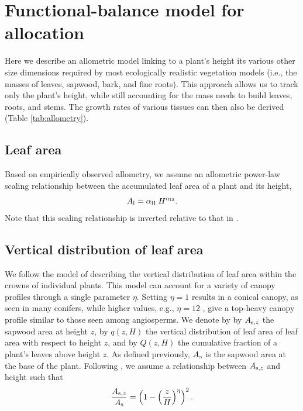 \documentclass[10pt,twoside]{article}
\begin{document}
\section{Functional-balance model for
allocation}\label{a-functional-balance-model-for-allocation}

Here we describe an allometric model linking to a plant's height its various other size dimensions
required by most ecologically realistic vegetation models
(i.e., the masses of leaves, sapwood, bark, and fine
roots). This approach allows us to track only the
plant's height, while still accounting for the mass needs to build
leaves, roots, and stems. The growth rates of various tissues can then
also be derived (Table \ref{tab:allometry}).

\subsection{Leaf area}\label{leaf-area}

Based on empirically observed allometry, we assume an allometric power-law
scaling relationship between the accumulated leaf area of a plant and
its height,
\begin{equation}\label{eq:ha}
A_{\rm l} = \alpha_{{\rm l1}} \, H^{\alpha_{{\rm l2}}}.
\end{equation}
Note that this scaling relationship is inverted relative to that in \citet{Falster-2011}.

\subsection{Vertical distribution of leaf
area}\label{vertical-distribution-of-leaf-area}

We follow the model of \citet{Yokozawa-1995} describing the vertical
distribution of leaf area within the crowns of individual plants. This
model can account for a variety of canopy profiles through a single
parameter \(\eta\). Setting \(\eta = 1\) results in a conical canopy, as
seen in many conifers, while higher values, e.g., \(\eta = 12\) , give a
top-heavy canopy profile similar to those seen among angiosperms. We denote by
by \(A_{{\rm s},z}\) the sapwood area at height \(z\), by \(q(z, H)\) the vertical distribution of leaf area of
leaf area with respect to height \(z\), and by \(Q(z, H)\) the cumulative fraction of a
plant's leaves above height \(z\). As defined previously, \(A_{\rm s}\) is the sapwood
area at the base of the plant. Following \citet{Yokozawa-1995}, we
assume a relationship between \(A_{{\rm s},z}\) and height such that
\begin{equation}\label{eq:crown1}
\frac{A_{{\rm s},z}}{A_{\rm s}} = \left(1 - \left(\frac{z}{H}\right)^\eta\right)^2.
\end{equation}
\end{document}
